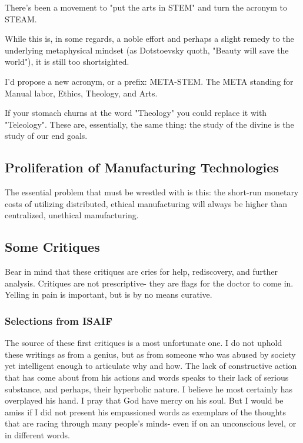 \documentclass[letterpaper]{article}
\begin{document}
There's been a movement to "put the arts in STEM" and turn the acronym to STEAM.

While this is, in some regards, a noble effort and perhaps a slight remedy to the underlying metaphysical mindset (as Dotstoevsky quoth, "Beauty will save the world"), it is still too shortsighted.

I'd propose a new acronym, or a prefix: META-STEM. The META standing for Manual labor, Ethics, Theology, and Arts.

If your stomach churns at the word "Theology" you could replace it with "Teleology". These are, essentially, the same thing: the study of the divine is the study of our end goals.

\subsection{Proliferation of Manufacturing Technologies}

The essential problem that must be wrestled with is this: the short-run monetary costs of utilizing distributed, ethical manufacturing will always be higher than centralized, unethical manufacturing.



\iffalse

\subsection{Some Critiques}

Bear in mind that these critiques are cries for help, rediscovery, and further analysis. Critiques are not prescriptive- they are flags for the doctor to come in. Yelling in pain is important, but is by no means curative.



\subsubsection{Selections from ISAIF}

The source of these first critiques is a most unfortunate one. I do not uphold these writings as from a genius, but as from someone who was abused by society yet intelligent enough to articulate why and how. The lack of constructive action that has come about from his actions and words speaks to their lack of serious substance, and perhaps, their hyperbolic nature. I believe he most certainly has overplayed his hand. I pray that God have mercy on his soul. But I would be amiss if I did not present his empassioned words as exemplars of the thoughts that are racing through many people's minds- even if on an unconscious level, or in different words.
\end{document}
